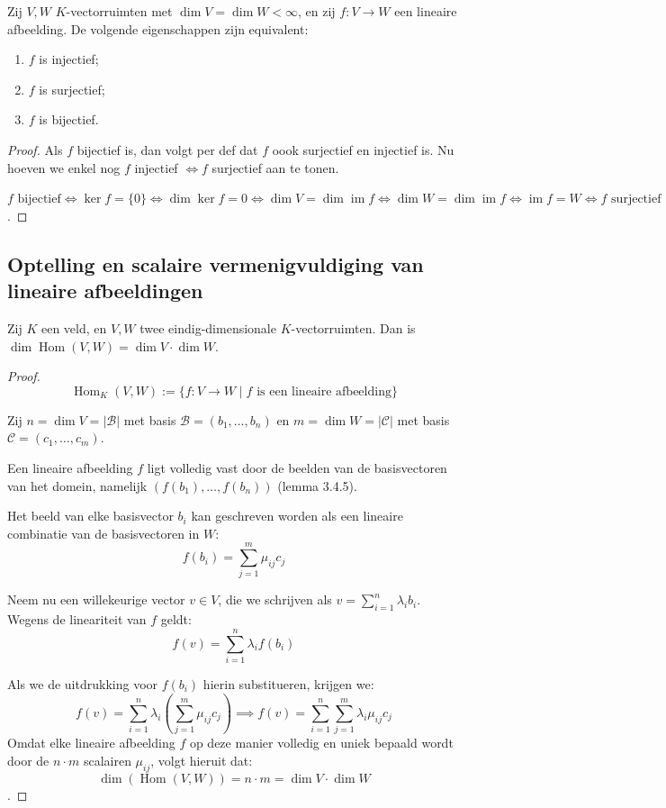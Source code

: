 \begin{gevolg}
    Zij $V, W$ $K$-vectorruimten met $\dim V = \dim W < \infty$, en zij $f \colon V \to W$ een lineaire afbeelding. De volgende eigenschappen zijn equivalent:
    \begin{enumerate}
        \item[(a)] $f$ is injectief;
        \item[(b)] $f$ is surjectief;
        \item[(c)] $f$ is bijectief.
    \end{enumerate}
\end{gevolg}
\begin{proof}
    Als \(f\) bijectief is, dan volgt per def dat \(f\) oook surjectief en injectief is.
    Nu hoeven we enkel nog \(f\) injectief \(\iff f\) surjectief aan te tonen.

    \(
        f \text{ bijectief} 
        \iff \ker f = \{0\}
        \iff \dim\ker f = 0
        \iff \dim V = \dim\operatorname{im}f
        \iff \dim W = \dim\operatorname{im}f
        \iff \operatorname{im}f=W
        \iff f \text{ surjectief}
    \).
\end{proof}
\subsection{Optelling en scalaire vermenigvuldiging van lineaire afbeeldingen}

\begin{stelling}[3.4.5]
    Zij $K$ een veld, en $V, W$ twee eindig-dimensionale $K$-vectorruimten.
    Dan is $\dim \operatorname{Hom}(V, W) = \dim V \cdot \dim W$.
\end{stelling}
\begin{proof}
    $$ \operatorname{Hom}_K(V,W) := \{f \colon V \to W \mid f \text{ is een lineaire afbeelding}\} $$
    
    Zij $n = \dim V = |\mathcal{B}|$ met basis $\mathcal{B} = (b_1, \dots, b_n)$ en $m = \dim W = |\mathcal{C}|$ met basis $\mathcal{C} = (c_1, \dots, c_m)$.

    Een lineaire afbeelding $f$ ligt volledig vast door de beelden van de basisvectoren van het domein, namelijk $(f(b_1), \dots, f(b_n))$
    (lemma 3.4.5).

    Het beeld van elke basisvector $b_i$ kan geschreven worden als een lineaire combinatie van de basisvectoren in $W$:
    $$ f(b_i) = \sum_{j=1}^{m} \mu_{ij} c_j $$

    Neem nu een willekeurige vector $v \in V$, die we schrijven als $v = \sum_{i=1}^{n} \lambda_i b_i$. Wegens de lineariteit van $f$ geldt:
    $$ f(v) = \sum_{i=1}^{n} \lambda_i f(b_i) $$
    
    Als we de uitdrukking voor $f(b_i)$ hierin substitueren, krijgen we:
    \[
        f(v) = \sum_{i=1}^{n} \lambda_i \left( \sum_{j=1}^{m} \mu_{ij} c_j \right) 
        \implies f(v) = \sum_{i=1}^{n} \sum_{j=1}^{m} \lambda_i \mu_{ij} c_j
    \]
    Omdat elke lineaire afbeelding $f$ op deze manier volledig en uniek bepaald wordt door de $n \cdot m$ scalairen $\mu_{ij}$, volgt hieruit dat:
    $$ \dim(\operatorname{Hom}(V,W)) = n \cdot m = \dim V \cdot \dim W $$.
\end{proof}
